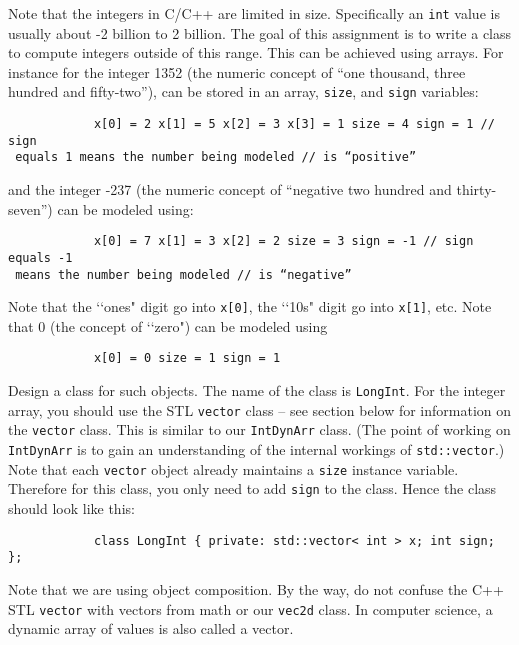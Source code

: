 Note that the integers in C/C++ are limited in size. Specifically an \verb!int!
value is usually about -2 billion to 2 billion. The goal of this assignment is
to write a class to compute integers outside of this range.  This can be
achieved using arrays. For instance for the integer 1352 (the numeric concept
of “one thousand, three hundred and fifty-two”), can be stored in an array,
\verb!size!, and \verb!sign! variables:

\begin{Verbatim}
            x[0] = 2 x[1] = 5 x[2] = 3 x[3] = 1 size = 4 sign = 1 // sign
 equals 1 means the number being modeled // is “positive”
\end{Verbatim}

and the integer -237 (the numeric concept of “negative two hundred and
thirty-seven”) can be modeled using:

\begin{Verbatim}
            x[0] = 7 x[1] = 3 x[2] = 2 size = 3 sign = -1 // sign equals -1
 means the number being modeled // is “negative”
\end{Verbatim}

Note that the \lq\lq ones" digit go into \verb!x[0]!, the \lq\lq 10s" digit go
into \verb!x[1]!, etc. Note that 0 (the concept of \lq\lq zero") can be modeled
using

\begin{Verbatim}
            x[0] = 0 size = 1 sign = 1
\end{Verbatim}

Design a class for such objects. The name of the class is \verb!LongInt!.  For
the integer array, you should use the STL \verb!vector! class – see section
below for information on the \verb!vector! class. This is similar to our
\verb!IntDynArr! class. (The point of working on \verb!IntDynArr!  is to gain
an understanding of the internal workings of \verb!std::vector!.)  Note that
each \verb!vector! object already maintains a \verb!size! instance
variable. Therefore for this class, you only need to add \verb!sign! to the
class. Hence the class should look like this:

\begin{Verbatim}
            class LongInt { private: std::vector< int > x; int sign; };
\end{Verbatim}

Note that we are using object composition. By the way, do not confuse the C++
STL \verb!vector! with vectors from math or our \verb!vec2d! class.  In
computer science, a dynamic array of values is also called a vector.


